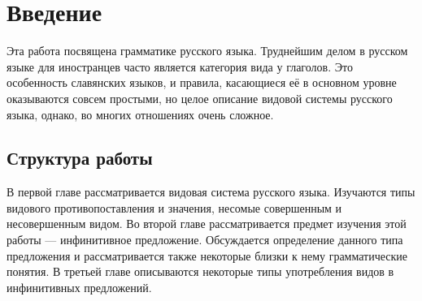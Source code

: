 \section{Введение}

Эта работа посвящена грамматике русского языка. Труднейшим делом в русском языке для иностранцев часто является категория вида у глаголов. Это особенность славянских языков, и правила, касающиеся её в основном уровне оказываются совсем простыми, но целое описание видовой системы русского языка, однако, во многих отношениях очень сложное. 




%
%

\subsection*{Структура работы}

В первой главе рассматривается видовая система русского языка. Изучаются типы видового противопоставления и значения, несомые совершенным и несовершенным видом. Во второй главе рассматривается предмет изучения этой работы --- инфинитивное предложение. Обсуждается определение данного типа предложения и рассматривается также некоторые близки к нему грамматические понятия. В третьей главе описываются некоторые типы употребления видов в инфинитивных предложений.